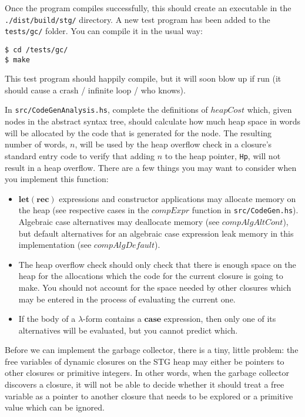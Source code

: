 \documentclass[10pt,a4paper]{exam} %
\begin{document}
\begin{mdframed}
Once the program compiles successfully, this should create an executable in the \texttt{./dist/build/stg/} directory. A new test program has been added to the \texttt{tests/gc/} folder. You can compile it in the usual way:
\begin{verbatim}
$ cd /tests/gc/
$ make
\end{verbatim} 
This test program should happily compile, but it will soon blow up if run (it should cause a crash / infinite loop / who knows).  
\end{mdframed}

\begin{questions}
\question In \texttt{src/CodeGenAnalysis.hs}, complete the definitions of $\mathit{heapCost}$ which, given nodes in the abstract syntax tree, should calculate how much heap space in words will be allocated by the code that is generated for the node. The resulting number of words, $n$, will be used by the heap overflow check in a closure's standard entry code to verify that adding $n$ to the heap pointer, \texttt{Hp}, will not result in a heap overflow. There are a few things you may want to consider when you implement this function:
\begin{itemize}
\item $\mathbf{let}(\mathbf{rec})$ expressions and constructor applications may allocate memory on the heap (see respective cases in the $\mathit{compExpr}$ function in \texttt{src/CodeGen.hs}). Algebraic case alternatives may deallocate memory (see $\mathit{compAlgAltCont}$), but default alternatives for an algebraic case expression leak memory in this implementation (see $\mathit{compAlgDefault}$). 
\item The heap overflow check should only check that there is enough space on the heap for the allocations which the code for the current closure is going to make. You should not account for the space needed by other closures which may be entered in the process of evaluating the current one.
\item If the body of a $\lambda$-form contains a $\mathbf{case}$ expression, then only one of its alternatives will be evaluated, but you cannot predict which. 
\end{itemize}
\question Before we can implement the garbage collector, there is a tiny, little problem: the free variables of dynamic closures on the STG heap may either be pointers to other closures or primitive integers. In other words, when the garbage collector discovers a closure, it will not be able to decide whether it should treat a free variable as a pointer to another closure that needs to be explored or a primitive value which can be ignored.


\end{questions}
\end{document}
